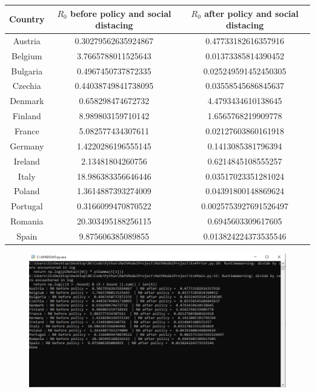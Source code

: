 \documentclass[a4paper]{article}
\begin{document}
\begin{center}
\begin{tabular}{ |c|c|c| } 
 \hline\hline
 Country & $R_0$ before policy and social distacing & $R_0$ after policy and social distacing \\ \hline\hline
 Austria & 0.30279562635924867     & 0.47733182616357916 \\ 
 Belgium & 3.7665788011525643     & 0.01373385814390452 \\
 Bulgaria & 0.4967450737872335     & 0.025249591452450305 \\ 
 Czechia & 0.44038749841738095     & 0.03558545686845637 \\
 Denmark & 0.658298474672732     & 4.4793434610138645 \\ 
 Finland & 8.989803159710142     & 1.6565768219909778 \\
 France & 5.082577434307611     & 0.02127603860161918 \\ 
 Germany & 1.4220286196555145   & 0.1413085381796394 \\
 Ireland & 2.13481804260756      & 0.6214845108555257 \\
 Italy & 18.986383356646446     & 0.03517023351281024 \\ 
 Poland & 1.3614887393274009     & 0.04391800148869624 \\
 Portugal & 0.3166099470870522     & 0.0025753927691526497 \\ 
 Romania & 20.303495188256115     & 0.6945603309617605\\
 Spain & 9.875606385089855     & 0.013824224373535546 \\ 
 \hline
\end{tabular}
\end{center}
    \begin{figure}[ht]
        \includegraphics[width=\linewidth, center]{Images/ex4plot.png}
    \end{figure}
    
\end{document}
